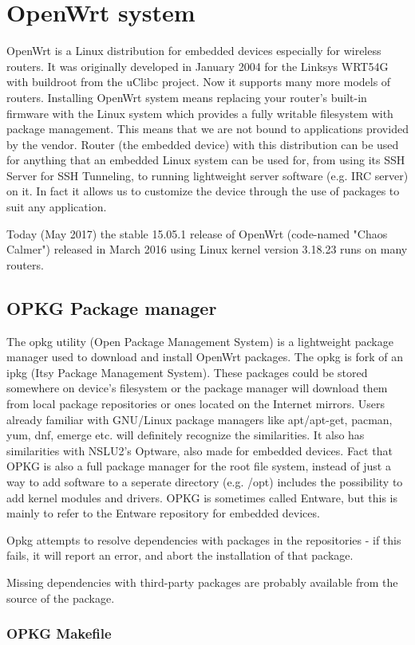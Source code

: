 %

\chapter{OpenWrt system}\label{owrt}
OpenWrt is a Linux distribution for embedded devices especially for wireless routers.
It was originally developed in January 2004 for the Linksys WRT54G with buildroot from the uClibc project.
Now it supports many more models of routers. 
Installing OpenWrt system means replacing your router’s built-in firmware with the Linux system which provides a fully writable filesystem with package management. 
This means that we are not bound to applications provided by the vendor.
Router (the embedded device) with this distribution can be used for anything that an embedded Linux system can be used for, from using its SSH Server for SSH Tunneling, to running lightweight server software (e.g. IRC server) on it. 
In fact it allows us to customize the device through the use of packages to suit any application.

Today (May 2017) the stable 15.05.1 release of OpenWrt (code-named "Chaos Calmer") released in March 2016 using Linux kernel version 3.18.23 runs on many routers.

\section{OPKG Package manager}

The opkg utility (Open Package Management System) is a lightweight package manager used to download and install OpenWrt packages.
The opkg is fork of an ipkg (Itsy Package Management System).
These packages could be stored somewhere on device's filesystem or the package manager will download them from local package repositories or ones located on the Internet mirrors. 
Users already familiar with GNU/Linux package managers like apt/apt-get, pacman, yum, dnf, emerge etc. will definitely recognize the similarities.
It also has similarities with NSLU2's Optware, also made for embedded devices.
Fact that OPKG is also a full package manager for the root file system, instead of just a way to add software to a seperate directory (e.g. /opt) includes the possibility to add kernel modules and drivers.
OPKG is sometimes called Entware, but this is mainly to refer to the Entware repository for embedded devices.

Opkg attempts to resolve dependencies with packages in the repositories - if this fails, it will report an error, and abort the installation of that package.

Missing dependencies with third-party packages are probably available from the source of the package.

\subsection{OPKG Makefile}




%

